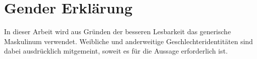 \chapter{Gender Erklärung}

In dieser Arbeit wird aus Gründen der besseren Lesbarkeit das generische Maskulinum verwendet. Weibliche und anderweitige Geschlechteridentitäten sind dabei ausdrücklich mitgemeint, soweit es für die Aussage erforderlich ist.

\afterpage{\blankpage}